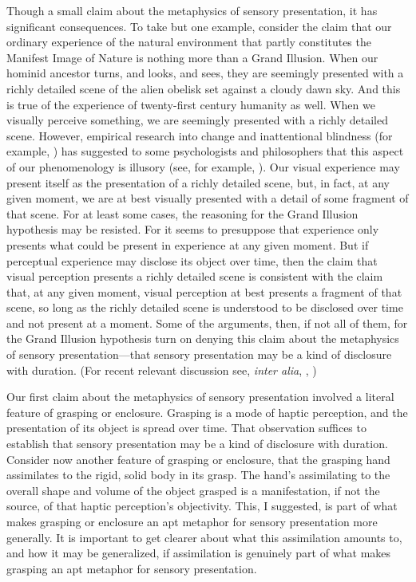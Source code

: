Though a small claim about the metaphysics of sensory presentation, it has significant consequences. To take but one example, consider the claim that our ordinary experience of the natural environment that partly constitutes the Manifest Image of Nature is nothing more than a Grand Illusion. When our hominid ancestor turns, and looks, and sees, they are seemingly presented with a richly detailed scene of the alien obelisk set against a cloudy dawn sky. And this is true of the experience of twenty-first century humanity as well. When we visually perceive something, we are seemingly presented with a richly detailed scene. However, empirical research into change and inattentional blindness (for example, \citealt{Simons:1999wf}) has suggested to some psychologists and philosophers that this aspect of our phenomenology is illusory (see, for example, \citealt{Blackmore:1995an}). Our visual experience may present itself as the presentation of a richly detailed scene, but, in fact, at any given moment, we are at best visually presented with a detail of some fragment of that scene. For at least some cases, the reasoning for the Grand Illusion hypothesis may be resisted. For it seems to presuppose that experience only presents what could be present in experience at any given moment. But if perceptual experience may disclose its object over time, then the claim that visual perception presents a richly detailed scene is consistent with the claim that, at any given moment, visual perception at best presents a fragment of that scene, so long as the richly detailed scene is understood to be disclosed over time and not present at a moment. Some of the arguments, then, if not all of them, for the Grand Illusion hypothesis turn on denying this claim about the metaphysics of sensory presentation---that sensory presentation may be a kind of disclosure with duration. (For recent relevant discussion see, \emph{inter alia}, \citealt{Noe:2004fk}, \citealt[72--74]{Campbell:2014aa})

Our first claim about the metaphysics of sensory presentation involved a literal feature of grasping or enclosure. Grasping is a mode of haptic perception, and the presentation of its object is spread over time. That observation suffices to establish that sensory presentation may be a kind of disclosure with duration. Consider now another feature of grasping or enclosure, that the grasping hand assimilates to the rigid, solid body in its grasp. The hand's assimilating to the overall shape and volume of the object grasped is a manifestation, if not the source, of that haptic perception's objectivity. This, I suggested, is part of what makes grasping or enclosure an apt metaphor for sensory presentation more generally. It is important to get clearer about what this assimilation amounts to, and how it may be generalized, if assimilation is genuinely part of what makes grasping an apt metaphor for sensory presentation.

